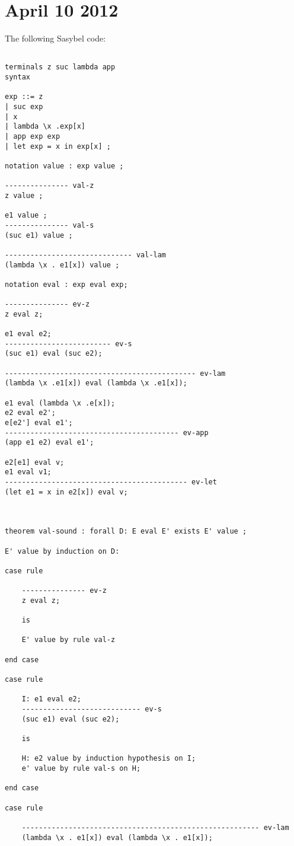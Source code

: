 \documentclass[12pt]{article}
\begin{document}
\section{April 10 2012}
The following \textmd{Sasybel} code:
\footnotesize\begin{verbatim}

terminals z suc lambda app
syntax

exp ::= z
| suc exp
| x
| lambda \x .exp[x]
| app exp exp
| let exp = x in exp[x] ;

notation value : exp value ;

--------------- val-z
z value ;

e1 value ;
--------------- val-s
(suc e1) value ;

------------------------------ val-lam
(lambda \x . e1[x]) value ;

notation eval : exp eval exp;

--------------- ev-z
z eval z;

e1 eval e2;
------------------------- ev-s
(suc e1) eval (suc e2);

--------------------------------------------- ev-lam
(lambda \x .e1[x]) eval (lambda \x .e1[x]);

e1 eval (lambda \x .e[x]);
e2 eval e2';
e[e2'] eval e1';
----------------------------------------- ev-app
(app e1 e2) eval e1';

e2[e1] eval v;
e1 eval v1;
------------------------------------------- ev-let
(let e1 = x in e2[x]) eval v;



theorem val-sound : forall D: E eval E' exists E' value ;

E' value by induction on D:

case rule

	--------------- ev-z
	z eval z;

	is

	E' value by rule val-z

end case

case rule

	I: e1 eval e2;
	---------------------------- ev-s
	(suc e1) eval (suc e2);

	is

	H: e2 value by induction hypothesis on I;
	e' value by rule val-s on H;

end case

case rule

	-------------------------------------------------------- ev-lam
	(lambda \x . e1[x]) eval (lambda \x . e1[x]);


\end{verbatim}
\end{document}
